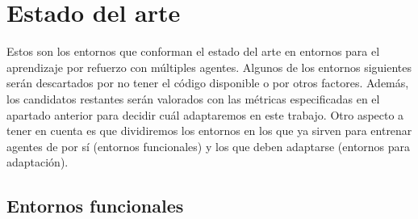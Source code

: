 \section{Estado del arte}
Estos son los entornos que conforman el estado del arte en entornos para el aprendizaje por refuerzo con múltiples agentes. Algunos de los entornos siguientes serán descartados por no tener el código disponible o por otros factores. Además, los candidatos restantes serán valorados con las métricas especificadas en el apartado anterior para decidir cuál adaptaremos en este trabajo. Otro aspecto a tener en cuenta es que dividiremos los entornos en los que ya sirven para entrenar agentes de por sí (entornos funcionales) y los que deben adaptarse (entornos para adaptación).  

\subsection{Entornos funcionales}
